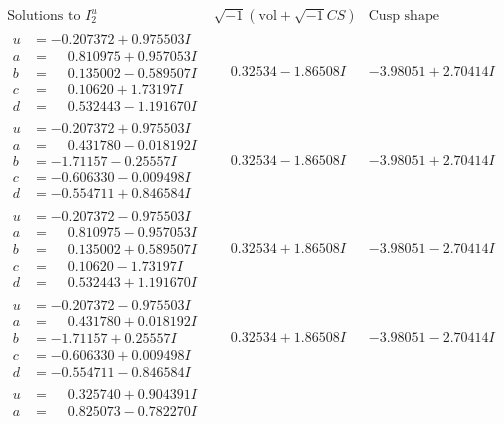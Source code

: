 \documentclass[1p]{elsarticle_modified}
\theoremstyle{definition}
\newcommand{\I}{\sqrt{-1}}
\begin{document}
$$\begin{array}{c|c|c}  
\text{Solutions to }I^u_{2}& \I (\text{vol} + \sqrt{-1}CS) & \text{Cusp shape}\\
 \hline 
\begin{aligned}
u &= -0.207372 + 0.975503 I \\
a &= \phantom{-}0.810975 + 0.957053 I \\
b &= \phantom{-}0.135002 - 0.589507 I \\
c &= \phantom{-}0.10620 + 1.73197 I \\
d &= \phantom{-}0.532443 - 1.191670 I\end{aligned}
 & \phantom{-}0.32534 - 1.86508 I & -3.98051 + 2.70414 I \\ \hline\begin{aligned}
u &= -0.207372 + 0.975503 I \\
a &= \phantom{-}0.431780 - 0.018192 I \\
b &= -1.71157 - 0.25557 I \\
c &= -0.606330 - 0.009498 I \\
d &= -0.554711 + 0.846584 I\end{aligned}
 & \phantom{-}0.32534 - 1.86508 I & -3.98051 + 2.70414 I \\ \hline\begin{aligned}
u &= -0.207372 - 0.975503 I \\
a &= \phantom{-}0.810975 - 0.957053 I \\
b &= \phantom{-}0.135002 + 0.589507 I \\
c &= \phantom{-}0.10620 - 1.73197 I \\
d &= \phantom{-}0.532443 + 1.191670 I\end{aligned}
 & \phantom{-}0.32534 + 1.86508 I & -3.98051 - 2.70414 I \\ \hline\begin{aligned}
u &= -0.207372 - 0.975503 I \\
a &= \phantom{-}0.431780 + 0.018192 I \\
b &= -1.71157 + 0.25557 I \\
c &= -0.606330 + 0.009498 I \\
d &= -0.554711 - 0.846584 I\end{aligned}
 & \phantom{-}0.32534 + 1.86508 I & -3.98051 - 2.70414 I \\ \hline\begin{aligned}
u &= \phantom{-}0.325740 + 0.904391 I \\
a &= \phantom{-}0.825073 - 0.782270 I \\

\end{aligned}
\end{array}$$
\end{document}
